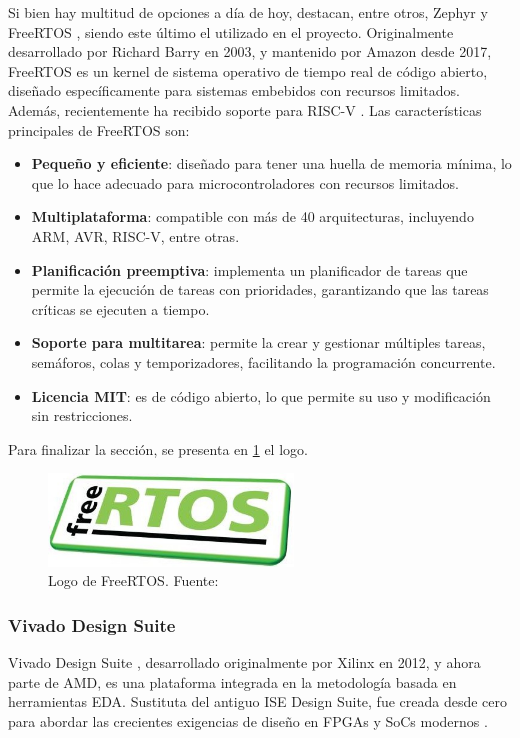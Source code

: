 Si bien hay multitud de opciones a día de hoy, destacan, entre otros, Zephyr \cite{zephyrInfo} y FreeRTOS \cite{freeRTOSInfo}, siendo este último el utilizado en el proyecto. Originalmente desarrollado por Richard Barry en 2003, y mantenido por Amazon desde 2017, FreeRTOS es un kernel de sistema operativo de tiempo real de código abierto, diseñado específicamente para sistemas embebidos con recursos limitados. Además, recientemente ha recibido soporte para RISC-V \cite{soporteRISCVFreeRTOS}. Las características principales de FreeRTOS son:

\begin{itemize}
    \item \textbf{Pequeño y eficiente}: diseñado para tener una huella de memoria mínima, lo que lo hace adecuado para microcontroladores con recursos limitados.
    \item \textbf{Multiplataforma}: compatible con más de 40 arquitecturas, incluyendo ARM, AVR, RISC-V, entre otras.
    \item \textbf{Planificación preemptiva}: implementa un planificador de tareas que permite la ejecución de tareas con prioridades, garantizando que las tareas críticas se ejecuten a tiempo.
    \item \textbf{Soporte para multitarea}: permite la crear y gestionar múltiples tareas, semáforos, colas y temporizadores, facilitando la programación concurrente.
    \item \textbf{Licencia MIT}: es de código abierto, lo que permite su uso y modificación sin restricciones.
\end{itemize}

Para finalizar la sección, se presenta en \ref{fig:logoFreeRTOS} el logo.

\begin{figure}[!ht]
  \centering
  \includegraphics[width=6.5cm]{figures/Logo_freeRTOS.png}
  \caption{Logo de FreeRTOS. Fuente: \cite{freeRTOSLogo}}
  \label{fig:logoFreeRTOS}
\end{figure}


\subsubsection{Vivado Design Suite}
\label{st:vivado}
Vivado Design Suite \cite{vivadoInfo}, desarrollado originalmente por Xilinx en 2012, y ahora parte de AMD, es una plataforma integrada en la metodología basada en herramientas EDA. Sustituta del antiguo ISE Design Suite, fue creada desde cero para abordar las crecientes exigencias de diseño en FPGAs y SoCs modernos \cite{vivadoHistoria_1}. 


